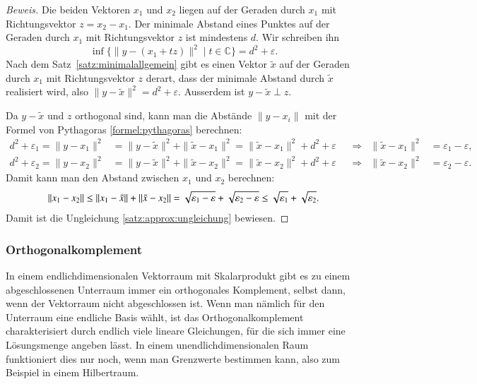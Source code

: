 \begin{proof}[Beweis]
Die beiden Vektoren $x_1$ und $x_2$ liegen auf der Geraden durch $x_1$ 
mit Richtungsvektor $z=x_2-x_1$.
Der minimale Abstand eines Punktes auf der Geraden durch $x_1$ mit 
Richtungsvektor $z$ ist mindestens $d$.
Wir schreiben ihn
\[
\inf \{ \|y- (x_1+tz)\|^2 \;|\; t\in \mathbb C\}
=
d^2 + \varepsilon.
\]
Nach dem Satz~\ref{satz:minimalallgemein} gibt es einen Vektor $\tilde{x}$
auf der Geraden durch $x_1$ mit Richtungsvektor $z$ derart, dass der minimale
Abstand durch $\tilde{x}$ realisiert wird, also
$\|y-\tilde{x}\|^2 = d^2+\varepsilon$.
Ausserdem ist $y-\tilde{x}\perp z$.

Da $y-\tilde{x}$ und $z$ orthogonal sind, kann man die Abstände
$\|y-x_i\|$ mit der Formel von Pythagoras \eqref{formel:pythagoras}
berechnen:
\begin{align*}
d^2 + \varepsilon_1
=
\|y-x_1\|^2 &= \|y-\tilde{x}\|^2 + \|\tilde{x}-x_1\|^2
=
\|\tilde{x}-x_1\|^2 + d^2 + \varepsilon
&&\Rightarrow&
\|\tilde{x}-x_1\|^2&=\varepsilon_1-\varepsilon,
\\
d^2 + \varepsilon_2
=
\|y-x_2\|^2 &= \|y-\tilde{x}\|^2 + \|\tilde{x}-x_2\|^2
=
\|\tilde{x}-x_2\|^2 + d^2 + \varepsilon
&&\Rightarrow&
\|\tilde{x}-x_2\|^2&=\varepsilon_2-\varepsilon.
\end{align*}
Damit kann man den Abstand zwischen $x_1$ und $x_2$ berechnen:
\[
\|x_1-x_2\|
\le
\|x_1-\tilde{x}\| + \| \tilde{x}-x_2\|
=
\sqrt{\mathstrut\varepsilon_1-\varepsilon}
+
\sqrt{\mathstrut\varepsilon_2-\varepsilon}
\le
\sqrt{\mathstrut\varepsilon_1} + \sqrt{\mathstrut\varepsilon_2}.
\]
Damit ist die Ungleichung \ref{satz:approx:ungleichung} bewiesen.
\end{proof}

\subsubsection{Orthogonalkomplement}
%
In einem endlichdimensionalen Vektorraum mit Skalarprodukt gibt es zu
einem abgeschlossenen Unterraum immer ein orthogonales Komplement,
selbst dann, wenn der Vektorraum nicht abgeschlossen ist.
Wenn man nämlich für den Unterraum eine endliche Basis wählt, ist das
Orthogonalkomplement charakterisiert durch endlich viele lineare 
Gleichungen, für die sich immer eine Lösungsmenge angeben lässt.
In einem unendlichdimensionalen Raum funktioniert dies nur noch, wenn
man Grenzwerte bestimmen kann, also zum Beispiel in einem Hilbertraum.

